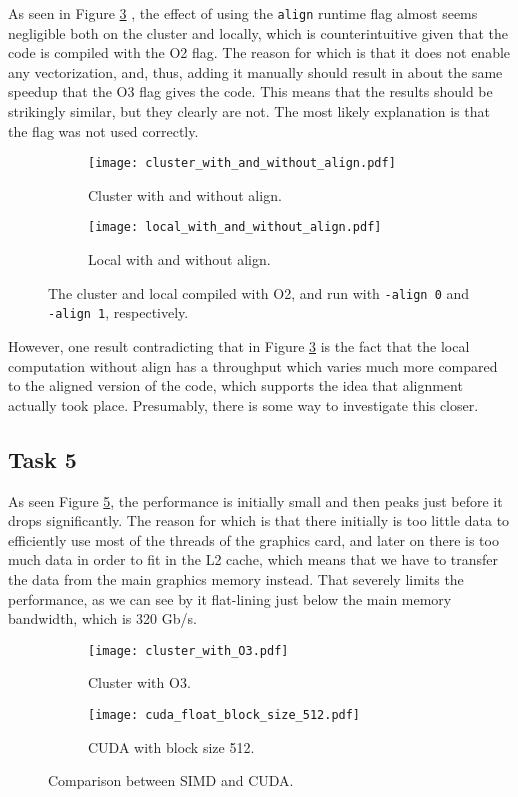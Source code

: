 \documentclass[10pt]{article}
\begin{document}
As seen in Figure \ref{fig:align} , the effect of using the \texttt{align} runtime flag almost seems negligible both on the cluster and locally, which is counterintuitive given that the code is compiled with the O2 flag. The reason for which is that it does not enable any vectorization, and, thus, adding it manually should result in about the same speedup that the O3 flag gives the code. This means that the results should be strikingly similar, but they clearly are not. The most likely explanation is that the flag was not used correctly.
\begin{figure}[H]
    \centering
    \begin{subfigure}[b]{0.49\textwidth}
        \centering
        \texttt{[image: cluster\_with\_and\_without\_align.pdf]}
        \caption{Cluster with and without align.}
        \label{fig:cluster_align}
    \end{subfigure}\hfill
    \begin{subfigure}[b]{0.49\textwidth}
        \centering
        \texttt{[image: local\_with\_and\_without\_align.pdf]}
        \caption{Local with and without align.}
        \label{fig:local_align}
    \end{subfigure}\hfill
    \caption{The cluster and local compiled with O2, and run with \texttt{-align 0} and \texttt{-align 1}, respectively.}
    \label{fig:align}
\end{figure}
However, one result contradicting that in Figure \ref{fig:align} is the fact that the local computation without align has a throughput which varies much more compared to the aligned version of the code, which supports the idea that alignment actually took place. Presumably, there is some way to investigate this closer.
\subsection{Task 5}
As seen Figure \ref{fig:gpu_reference}, the performance is initially small and then peaks just before it drops significantly. The reason for which is that there initially is too little data to efficiently use most of the threads of the graphics card, and later on there is too much data in order to fit in the L2 cache, which means that we have to transfer the data from the main graphics memory instead. That severely limits the performance, as we can see by it flat-lining just below the main memory bandwidth, which is 320 Gb/s.
\begin{figure}[H]
    \centering
    \begin{subfigure}[b]{0.49\textwidth}
        \centering
        \texttt{[image: cluster\_with\_O3.pdf]}
        \caption{Cluster with O3.}
        \label{fig:cpu_reference}
    \end{subfigure}\hfill
    \begin{subfigure}[b]{0.49\textwidth}
        \centering
        \texttt{[image: cuda\_float\_block\_size\_512.pdf]}
        \caption{CUDA with block size 512.}
        \label{fig:gpu_reference}
    \end{subfigure}\hfill
    \caption{Comparison between SIMD and CUDA.}
    \label{fig:simd_and_cuda_comparison}
\end{figure}
\end{document}
